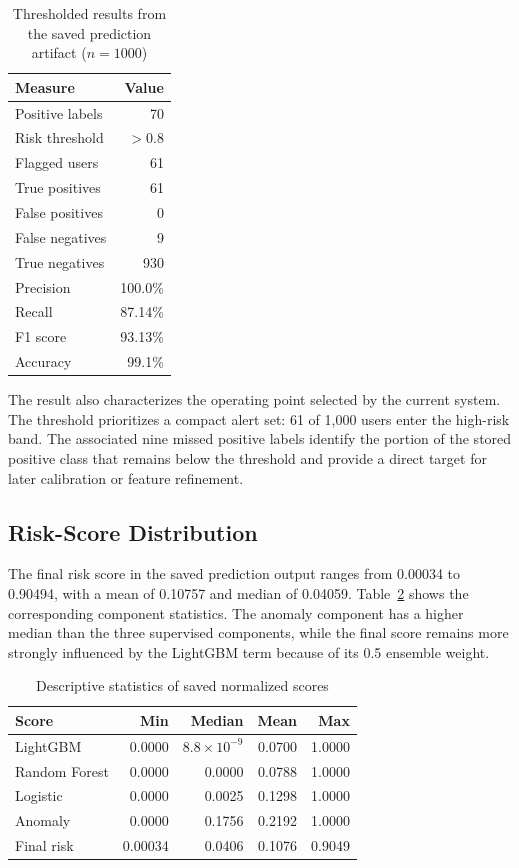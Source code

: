 \begin{table}[t]
\caption{Thresholded results from the saved prediction artifact ($n=1000$)}
\label{tab:metrics}
\centering
\footnotesize
\begin{tabular}{lr}
\toprule
Measure & Value \\
\midrule
Positive labels & 70 \\
Risk threshold & $>0.8$ \\
Flagged users & 61 \\
True positives & 61 \\
False positives & 0 \\
False negatives & 9 \\
True negatives & 930 \\
Precision & 100.0\% \\
Recall & 87.14\% \\
F1 score & 93.13\% \\
Accuracy & 99.1\% \\
\bottomrule
\end{tabular}
\end{table}

The result also characterizes the operating point selected by the current system. The threshold prioritizes a compact alert set: 61 of 1,000 users enter the high-risk band. The associated nine missed positive labels identify the portion of the stored positive class that remains below the threshold and provide a direct target for later calibration or feature refinement.

\subsection{Risk-Score Distribution}
The final risk score in the saved prediction output ranges from 0.00034 to 0.90494, with a mean of 0.10757 and median of 0.04059. Table~\ref{tab:scorestats} shows the corresponding component statistics. The anomaly component has a higher median than the three supervised components, while the final score remains more strongly influenced by the LightGBM term because of its 0.5 ensemble weight.

\begin{table}[t]
\caption{Descriptive statistics of saved normalized scores}
\label{tab:scorestats}
\centering
\footnotesize
\begin{tabular}{lrrrr}
\toprule
Score & Min & Median & Mean & Max \\
\midrule
LightGBM & 0.0000 & $8.8\times10^{-9}$ & 0.0700 & 1.0000 \\
Random Forest & 0.0000 & 0.0000 & 0.0788 & 1.0000 \\
Logistic & 0.0000 & 0.0025 & 0.1298 & 1.0000 \\
Anomaly & 0.0000 & 0.1756 & 0.2192 & 1.0000 \\
Final risk & 0.00034 & 0.0406 & 0.1076 & 0.9049 \\
\bottomrule
\end{tabular}
\end{table}

